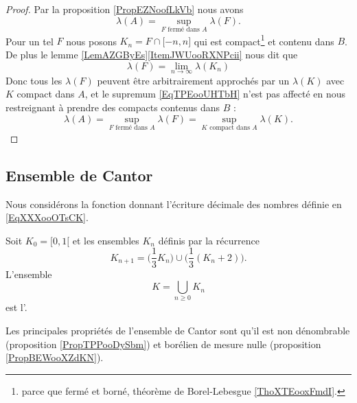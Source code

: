 \begin{proof}
    Par la proposition \ref{PropEZNoofLkVb} nous avons
    \begin{equation}    \label{EqTPEooUHTbH}
        \lambda(A)=\sup_{ F\text{ fermé dans } A}\lambda(F).
    \end{equation}
    Pour un tel \( F\) nous posons \( K_n=F\cap\mathopen[ -n , n \mathclose]\) qui est compact\footnote{parce que fermé et borné, théorème de Borel-Lebesgue \ref{ThoXTEooxFmdI}.} et contenu dans \( B\). De plus le lemme \ref{LemAZGByEs}\ref{ItemJWUooRXNPcii} nous dit que
    \begin{equation}
        \lambda(F)=\lim_{n\to \infty} \lambda(K_n)
    \end{equation}
    Donc tous les \( \lambda(F)\) peuvent être arbitrairement approchés par un \( \lambda(K)\) avec \( K\) compact dans \( A\), et le supremum \eqref{EqTPEooUHTbH} n'est pas affecté en nous restreignant à prendre des compacts contenus dans \( B\) :
    \begin{equation}    
        \lambda(A)=\sup_{ F\text{ fermé dans } A}\lambda(F)=\sup_{ K\text{ compact dans } A}\lambda(K).
    \end{equation}
\end{proof}

\subsection{Ensemble de Cantor}

Nous considérons la fonction donnant l'écriture décimale des nombres définie en \eqref{EqXXXooOTsCK}.

\begin{definition}  \label{DefIYDooVIDJs}
    Soit \( K_0=\mathopen[ 0 , 1 [\) et les ensembles \( K_n\) définis par la récurrence
        \begin{equation}
            K_{n+1}=\big( \frac{1}{ 3 }K_n \big)\cup\big( \frac{1}{ 3 }(K_n+2) \big).
        \end{equation}
        L'ensemble
        \begin{equation}
            K=\bigcup_{n\geq 0}K_n
        \end{equation}
        est l'.
\end{definition}
Les principales propriétés de l'ensemble de Cantor sont qu'il est non dénombrable (proposition \ref{PropTPPooDySbm}) et borélien de mesure nulle (proposition \ref{PropBEWooXZdKN}).

